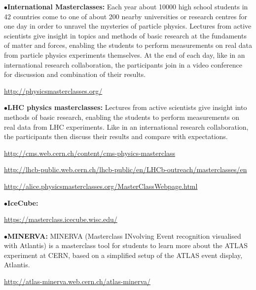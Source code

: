 



\medskip

\item{$\bullet$}{\bf International Masterclasses:}
Each year about 10000 high school students in 42 countries come to one of about 200 nearby universities or research centres for one day in order to unravel the mysteries of particle physics. Lectures from active scientists give insight in topics and methods of basic research at the fundaments of matter and forces, enabling the students to perform measurements on real data from particle physics experiments themselves. At the end of each day, like in an international research collaboration, the participants join in a video conference for discussion and combination of their results.
	\item{}\qquad\url{http://physicsmasterclasses.org/}

\medskip

\item{$\bullet$}{\bf LHC physics masterclasses:}
Lectures from active scientists give insight into methods of basic research, enabling the students to perform measurements on real data from LHC experiments. Like in an international research collaboration, the participants then discuss their results and compare with expectations.
	\item{}\qquad\url{http://cms.web.cern.ch/content/cms-physics-masterclass}
	\item{}\qquad\url{http://lhcb-public.web.cern.ch/lhcb-public/en/LHCb-outreach/masterclasses/en}
	\item{}\qquad\url{http://alice.physicsmasterclasses.org/MasterClassWebpage.html}

\medskip

\item{$\bullet$}{\bf IceCube:}
	\item{}\qquad\url{https://masterclass.icecube.wisc.edu/}

\medskip

\item{$\bullet$}{\bf MINERVA:}
MINERVA (Masterclass INvolving Event recognition visualised with Atlantis) is a masterclass tool for students to learn more about the ATLAS experiment at CERN, based on a simplified setup of the ATLAS event display, Atlantis.
	\item{}\qquad\url{http://atlas-minerva.web.cern.ch/atlas-minerva/}

